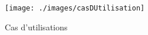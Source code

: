 \begin{figure}[htbp]
  \centering
 \texttt{[image: ./images/casDUtilisation]} 
  \caption{Cas d'utilisations}
  \label{fig:casUtilisation}
\end{figure}
